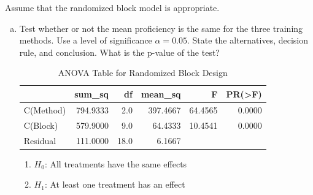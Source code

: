 \documentclass{article}
\begin{document}
Assume that the randomized block model is appropriate.
\begin{enumerate}[(a)]
	\item Test whether or not the mean proficiency is the same for the three training methods. Use a level of significance $\alpha = 0.05$. State the alternatives, decision rule, and conclusion. What is the p-value of the test?
	      \begin{table}[htbp]
		      \centering
		      \caption{ANOVA Table for Randomized Block Design}
		      \begin{tabular}{lrrrrr}
			      \toprule
			                & sum\_sq  & df   & mean\_sq & F       & PR(>F) \\
			      \midrule
			      C(Method) & 794.9333 & 2.0  & 397.4667 & 64.4565 & 0.0000 \\
			      C(Block)  & 579.9000 & 9.0  & 64.4333  & 10.4541 & 0.0000 \\
			      Residual  & 111.0000 & 18.0 & 6.1667   &         &        \\
			      \bottomrule
		      \end{tabular}
	      \end{table}
	      \begin{enumerate}
		      \item $H_0$: All treatments have the same effects
		      \item $H_1$: At least one treatment has an effect
	      \end{enumerate}


\end{enumerate}
\end{document}
